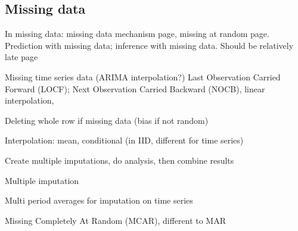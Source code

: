 
\subsection{Missing data}


In missing data: missing data mechanism page, missing at random page. Prediction with missing data; inference with missing data. Should be relatively late page

Missing time series data (ARIMA interpolation?) Last Observation Carried Forward (LOCF); Next Observation Carried Backward (NOCB), linear interpolation,

Deleting whole row if missing data (bias if not random)

Interpolation: mean, conditional (in IID, different for time series)

Create multiple imputations, do analysis, then combine results

Multiple imputation

Multi period averages for imputation on time series

Missing Completely At Random (MCAR), different to MAR
